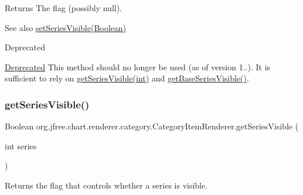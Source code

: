 \begin{DoxyReturn}{Returns}
The flag (possibly {\ttfamily null}).
\end{DoxyReturn}
\begin{DoxySeeAlso}{See also}
\mbox{\hyperlink{interfaceorg_1_1jfree_1_1chart_1_1renderer_1_1category_1_1_category_item_renderer_aefe9bb9b43af3cb3b3c72a69af4e1d94}{set\+Series\+Visible(\+Boolean)}}
\end{DoxySeeAlso}
\begin{DoxyRefDesc}{Deprecated}
\item[\mbox{\hyperlink{deprecated__deprecated000153}{Deprecated}}]This method should no longer be used (as of version 1..). It is sufficient to rely on \mbox{\hyperlink{interfaceorg_1_1jfree_1_1chart_1_1renderer_1_1category_1_1_category_item_renderer_a1d3a9d0a19083c8c15bfa752455aa924}{get\+Series\+Visible(int)}} and \mbox{\hyperlink{interfaceorg_1_1jfree_1_1chart_1_1renderer_1_1category_1_1_category_item_renderer_a7f6fcee9da6a61416616995353566042}{get\+Base\+Series\+Visible()}}. \end{DoxyRefDesc}
\mbox{\label{interfaceorg_1_1jfree_1_1chart_1_1renderer_1_1category_1_1_category_item_renderer_a1d3a9d0a19083c8c15bfa752455aa924}} 
\subsubsection{\texorpdfstring{get\+Series\+Visible()}{getSeriesVisible()}\hspace{0.1cm}{\footnotesize\ttfamily [2/2]}}
{\footnotesize\ttfamily Boolean org.\+jfree.\+chart.\+renderer.\+category.\+Category\+Item\+Renderer.\+get\+Series\+Visible (\begin{DoxyParamCaption}\item[{int}]{series }\end{DoxyParamCaption})}

Returns the flag that controls whether a series is visible.


